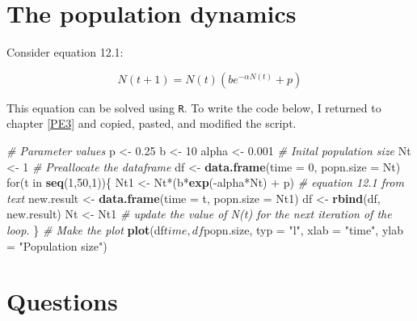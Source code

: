 \documentclass[]{book}
\newenvironment{Shaded}{\begin{snugshade}}{\end{snugshade}}
\newcommand{\KeywordTok}[1]{\textcolor[rgb]{0.13,0.29,0.53}{\textbf{{#1}}}}
\newcommand{\DataTypeTok}[1]{\textcolor[rgb]{0.13,0.29,0.53}{{#1}}}
\newcommand{\DecValTok}[1]{\textcolor[rgb]{0.00,0.00,0.81}{{#1}}}
\newcommand{\FloatTok}[1]{\textcolor[rgb]{0.00,0.00,0.81}{{#1}}}
\newcommand{\StringTok}[1]{\textcolor[rgb]{0.31,0.60,0.02}{{#1}}}
\newcommand{\CommentTok}[1]{\textcolor[rgb]{0.56,0.35,0.01}{\textit{{#1}}}}
\newcommand{\NormalTok}[1]{{#1}}
\begin{document}
\section{The population dynamics}\label{the-population-dynamics}

Consider equation 12.1:

\begin{equation}
N(t+1) = N(t)\left(b e^{-\alpha N(t)} + p\right)  \label{eq:plant}
\end{equation}

This equation can be solved using \texttt{R}. To write the code below, I
returned to chapter \ref{PE3} and copied, pasted, and modified the
script.

\begin{Shaded}
\begin{Highlighting}[]
\CommentTok{# Parameter values}
\NormalTok{p <-}\StringTok{ }\FloatTok{0.25}
\NormalTok{b <-}\StringTok{ }\DecValTok{10}
\NormalTok{alpha <-}\StringTok{ }\FloatTok{0.001}
\CommentTok{# Inital population size}
\NormalTok{Nt <-}\StringTok{ }\DecValTok{1}
\CommentTok{# Preallocate the dataframe}
\NormalTok{df <-}\StringTok{ }\KeywordTok{data.frame}\NormalTok{(}\DataTypeTok{time =} \DecValTok{0}\NormalTok{, }\DataTypeTok{popn.size =} \NormalTok{Nt)}
\NormalTok{for(t in }\KeywordTok{seq}\NormalTok{(}\DecValTok{1}\NormalTok{,}\DecValTok{50}\NormalTok{,}\DecValTok{1}\NormalTok{))\{}
  \NormalTok{Nt1 <-}\StringTok{ }\NormalTok{Nt*(b*}\KeywordTok{exp}\NormalTok{(-alpha*Nt) +}\StringTok{ }\NormalTok{p) }\CommentTok{# equation 12.1 from text}
  \NormalTok{new.result <-}\StringTok{ }\KeywordTok{data.frame}\NormalTok{(}\DataTypeTok{time =} \NormalTok{t, }\DataTypeTok{popn.size =} \NormalTok{Nt1)}
  \NormalTok{df <-}\StringTok{ }\KeywordTok{rbind}\NormalTok{(df, new.result)}
  \NormalTok{Nt <-}\StringTok{ }\NormalTok{Nt1 }\CommentTok{# update the value of N(t) for the next iteration of the loop.}
\NormalTok{\}}
\CommentTok{# Make the plot}
\KeywordTok{plot}\NormalTok{(df$time, df$popn.size, }\DataTypeTok{typ =} \StringTok{"l"}\NormalTok{, }\DataTypeTok{xlab =} \StringTok{"time"}\NormalTok{, }\DataTypeTok{ylab =} \StringTok{"Population size"}\NormalTok{)}
\end{Highlighting}
\end{Shaded}

\section{Questions}\label{questions}
\end{document}
